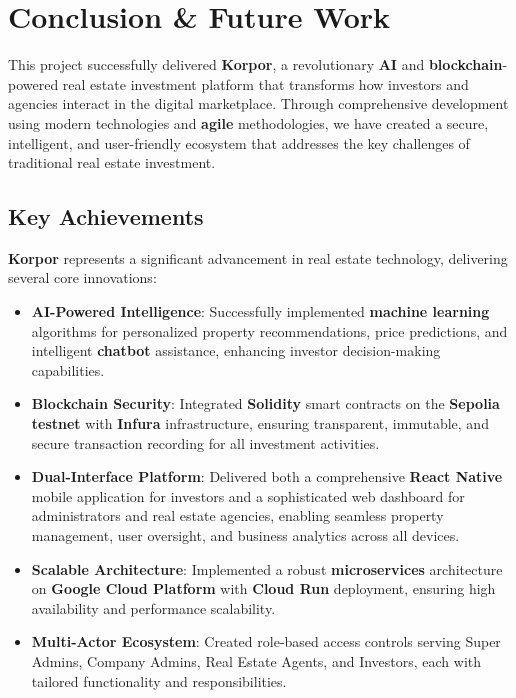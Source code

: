 \chapter{Conclusion \& Future Work}


This project successfully delivered \textbf{\textcolor{primary}{Korpor}}, a revolutionary \textbf{AI} and \textbf{blockchain}-powered real estate investment platform that transforms how investors and agencies interact in the digital marketplace. Through comprehensive development using modern technologies and \textbf{agile} methodologies, we have created a secure, intelligent, and user-friendly ecosystem that addresses the key challenges of traditional real estate investment.

\section{Key Achievements}

\textbf{\textcolor{primary}{Korpor}} represents a significant advancement in real estate technology, delivering several core innovations:

\begin{itemize}
    \item \textbf{AI-Powered Intelligence}: Successfully implemented \textbf{machine learning} algorithms for personalized property recommendations, price predictions, and intelligent \textbf{chatbot} assistance, enhancing investor decision-making capabilities.
    
    \item \textbf{Blockchain Security}: Integrated \textbf{Solidity} smart contracts on the \textbf{Sepolia testnet} with \textbf{Infura} infrastructure, ensuring transparent, immutable, and secure transaction recording for all investment activities.
    
    \item \textbf{Dual-Interface Platform}: Delivered both a comprehensive \textbf{React Native} mobile application for investors and a sophisticated web dashboard for administrators and real estate agencies, enabling seamless property management, user oversight, and business analytics across all devices.
    
    \item \textbf{Scalable Architecture}: Implemented a robust \textbf{microservices} architecture on \textbf{Google Cloud Platform} with \textbf{Cloud Run} deployment, ensuring high availability and performance scalability.
    
    \item \textbf{Multi-Actor Ecosystem}: Created role-based access controls serving Super Admins, Company Admins, Real Estate Agents, and Investors, each with tailored functionality and responsibilities.
\end{itemize}

